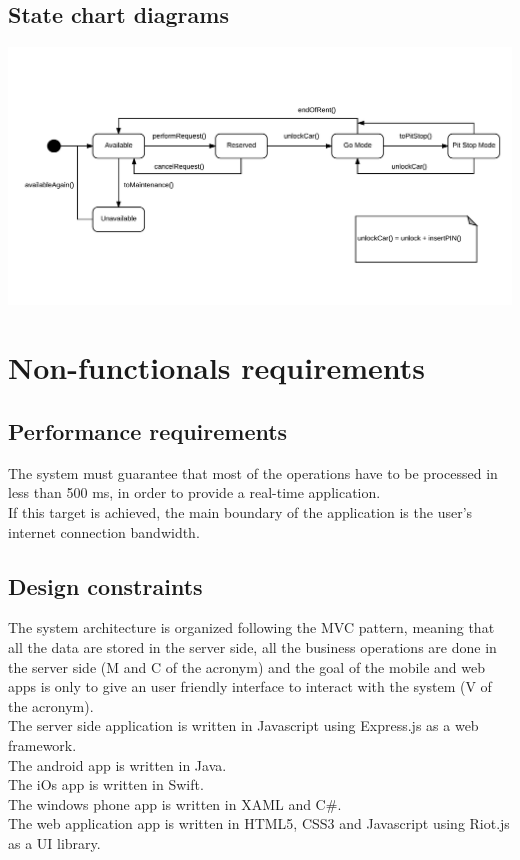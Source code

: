 \subsection{State chart diagrams}
\includegraphics[width=\textwidth, keepaspectratio]{../images/diagram/state_chart/car_status.pdf}

\clearpage
\section{Non-functionals requirements}

\subsection{Performance requirements}
The system must guarantee that most of the operations have to be processed in less than 500 ms, in order to provide a real-time application.\\
If this target is achieved, the main boundary of the application is the user’s internet connection bandwidth.

\subsection{Design constraints}
The system architecture is organized following the MVC pattern, meaning that all the data are stored in the server side, all the business operations are done in the server side (M and C of the acronym) and the goal of the mobile and web apps is only to give an user friendly interface to interact with the system (V of the acronym).\\
The server side application is written in Javascript using Express.js as a web framework.\\
The android app is written in Java.\\
The iOs app is written in Swift.\\
The windows phone app is written in XAML and C\#.\\
The web application app is written in HTML5, CSS3 and Javascript using Riot.js as a UI library.

